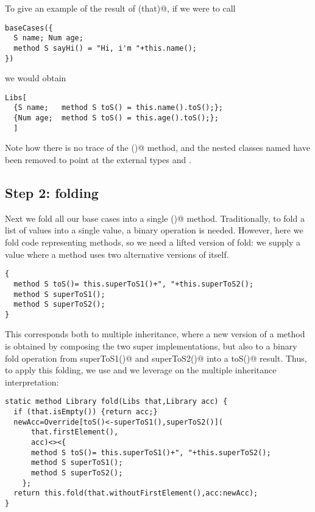 \noindent
To give an example of the result of \Q@baseCases(that)@, if we were to call 

\begin{lstlisting}
baseCases({
  S name; Num age;
  method S sayHi() = "Hi, i'm "+this.name();
})
\end{lstlisting}

\noindent
we would obtain

\begin{lstlisting}
Libs[
  {S name;   method S toS() = this.name().toS();};
  {Num age;  method S toS() = this.age().toS();};
  ]
\end{lstlisting}

\noindent
Note how there is no trace of the \Q@sayHi()@ method, and the
nested classes named \Q@T@ have been removed to point at the
external types \Q@S@ and \Q@Num@.


\subsection*{Step 2: folding}
Next we fold all our base cases into a single \Q@toS()@ method.
Traditionally, to fold a list of values into a single value, a binary operation is needed.
However, here we fold code representing methods,
so we need a lifted version of fold:
 we supply a \Q@Library@ value where a method
uses two alternative versions of itself. 

\begin{lstlisting}
{
  method S toS()= this.superToS1()+", "+this.superToS2();
  method S superToS1();
  method S superToS2();
}
\end{lstlisting}

This corresponds both to multiple inheritance, where a new version of a method is obtained by composing the two super implementations,
but also to a binary fold operation from \Q@S superToS1()@ and \Q@S superToS2()@
into a \Q@S toS()@ result.
Thus, to apply this folding, we use \Q@Override@ and we leverage on the multiple inheritance interpretation:

\begin{lstlisting}
static method Library fold(Libs that,Library acc) {
  if (that.isEmpty()) {return acc;}
  newAcc=Override[toS()<-superToS1(),superToS2()](
      that.firstElement(),
      acc)<><{
      method S toS()= this.superToS1()+", "+this.superToS2();
      method S superToS1();
      method S superToS2();
    };
  return this.fold(that.withoutFirstElement(),acc:newAcc);
}
\end{lstlisting}

